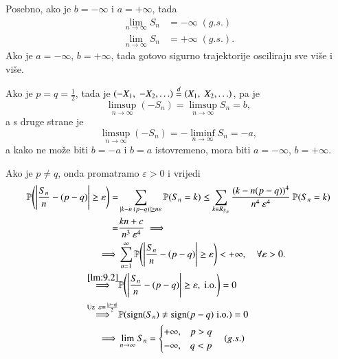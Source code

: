 \begin{pr}
    Posebno, ako je $b = -\infty$ i $a = + \infty$, tada
    \begin{equation*}
        \begin{aligned}
            \lim\limits_{n  \to \infty} S_n &= -\infty \; (g.s.)\\
            \lim\limits_{n \to \infty} S_n &= +\infty \; (g.s.).
        \end{aligned}
    \end{equation*}
    Ako je $a = -\infty$, $b = +\infty$, tada gotovo sigurno trajektorije osciliraju sve vi\v se i vi\v se.

    Ako je $p = q = \frac{1}{2}$, tada je $(-X_1, \; -X_2, \ldots) \overset{d}{=} (X_1, \; X_2, \ldots)$, pa je
    \begin{equation*}
        \limsup\limits_{n \to \infty} (-S_n) = \limsup\limits_{n \to \infty} S_n = b,
    \end{equation*}
    a s druge strane je
    \begin{equation*}
        \limsup\limits_{n \to \infty} (-S_n) = - \liminf\limits_{n \to \infty} S_n = -a,
    \end{equation*}
    a kako ne mo\v ze biti $b = -a$ i $b = a$ istovremeno, mora biti $a = -\infty$, $b = +\infty$.

    Ako je $p \neq q$, onda promatramo $\varepsilon > 0$ i vrijedi
    \begin{equation*}
        \begin{aligned}
            \mathbb{P} \Bigg( \Bigg|\frac{S_n}{n} - (p - q) \Bigg| \geq \varepsilon \Bigg) =& \sum\limits_{|k - n \: (p-q)| \geq n \varepsilon}^{} \mathbb{P}({S_n = k}) \leq \sum\limits_{k \in R_{S_n}}^{} \frac{(k - n(p-q))^4}{n^4 \: \varepsilon^4} \: \mathbb{P}({S_n = k})\\
            =& \frac{k n + c}{n^3 \: \varepsilon^4} \implies\\
            \implies & \sum\limits_{n = 1}^{\infty} \mathbb{P} \Bigg( \Bigg| \frac{S_n}{n} - (p - q) \Bigg| \geq \varepsilon \Bigg) < + \infty, \quad \forall \varepsilon > 0.\\
            \overset{\ref{lm:9.2}}{\implies} & \mathbb{P} \Bigg( \Bigg| \frac{S_n}{n} - (p - q) \Bigg| \geq \varepsilon, \; \mathrm{i.o.} \Bigg) = 0\\
            \overset{\textnormal{Uz }\; \varepsilon = \frac{|p - q|}{2}}{\implies} & \mathbb{P}({\operatorname{sign} (S_n) \neq \operatorname{sign} (p - q) \; \mathrm{i.o.}}) = 0\\
            \implies & \lim\limits_{n \to \infty} S_n
            =
            \begin{cases}
                + \infty, &p > q\\
                - \infty, &q < p
            \end{cases}
            \quad (g.s.)
        \end{aligned}
    \end{equation*}
\end{pr}

